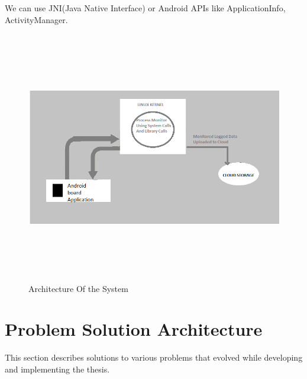 \documentclass[12pt]{report}
\begin{document}
	We can use JNI(Java Native Interface) or Android API\textquotesingle s like ApplicationInfo, ActivityManager.
	
	
	
    \begin{figure}
    	\centering
    	\includegraphics[width=1.0\textwidth,width=15cm,height=11cm]{Archi_jul11}
    	\caption{Architecture Of the System}
    \end{figure}
\chapter{Problem Solution Architecture}

This section describes solutions to various problems that evolved while developing and implementing the thesis.
\end{document}

